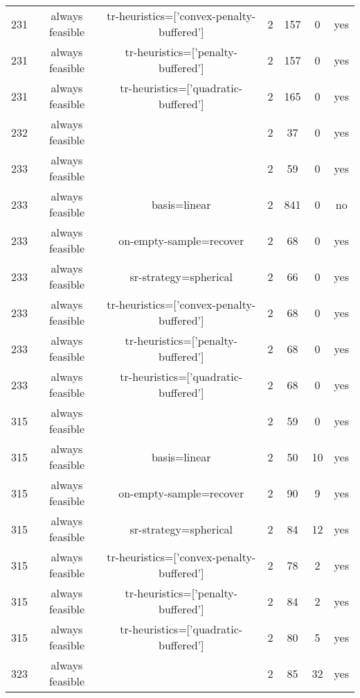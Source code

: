 \begin{scriptsize}
\begin{center}
\begin{longtable}{ccccccc}
231 & always feasible & tr-heuristics=['convex-penalty-buffered'] & 2 &    157 &      0 &     yes\\
231 & always feasible &        tr-heuristics=['penalty-buffered'] & 2 &    157 &      0 &     yes\\
231 & always feasible &      tr-heuristics=['quadratic-buffered'] & 2 &    165 &      0 &     yes\\
232 & always feasible &                                           & 2 &     37 &      0 &     yes\\
233 & always feasible &                                           & 2 &     59 &      0 &     yes\\
233 & always feasible &                              basis=linear & 2 &    841 &      0 &      no\\
233 & always feasible &                   on-empty-sample=recover & 2 &     68 &      0 &     yes\\
233 & always feasible &                     sr-strategy=spherical & 2 &     66 &      0 &     yes\\
233 & always feasible & tr-heuristics=['convex-penalty-buffered'] & 2 &     68 &      0 &     yes\\
233 & always feasible &        tr-heuristics=['penalty-buffered'] & 2 &     68 &      0 &     yes\\
233 & always feasible &      tr-heuristics=['quadratic-buffered'] & 2 &     68 &      0 &     yes\\
315 & always feasible &                                           & 2 &     59 &      0 &     yes\\
315 & always feasible &                              basis=linear & 2 &     50 &     10 &     yes\\
315 & always feasible &                   on-empty-sample=recover & 2 &     90 &      9 &     yes\\
315 & always feasible &                     sr-strategy=spherical & 2 &     84 &     12 &     yes\\
315 & always feasible & tr-heuristics=['convex-penalty-buffered'] & 2 &     78 &      2 &     yes\\
315 & always feasible &        tr-heuristics=['penalty-buffered'] & 2 &     84 &      2 &     yes\\
315 & always feasible &      tr-heuristics=['quadratic-buffered'] & 2 &     80 &      5 &     yes\\
323 & always feasible &                                           & 2 &     85 &     32 &     yes\\

\end{longtable}
\end{center}
\end{scriptsize}
